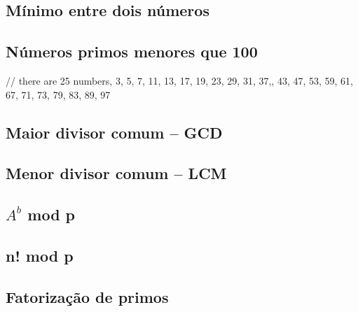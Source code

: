 \documentclass[a4paper,12pt]{article}
\begin{document}

\subsection{Mínimo entre dois números}


\subsection{Números primos menores que 100}

// there are 25 numbers, 3, 5, 7, 11, 13, 17, 19, 23, 29, 31, 37,, 43, 47, 53, 59, 61, 67, 71, 73, 79, 83, 89, 97

\subsection{Maior divisor comum – GCD}


\subsection{Menor divisor comum – LCM}


\subsection{$A^b$ mod p}


\subsection{n! mod p}


\subsection{Fatorização de primos}


\newpage
\end{document}
